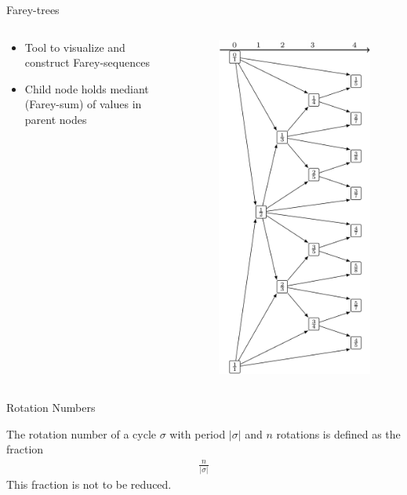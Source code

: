 \begin{frame}{Farey-trees}
	\begin{columns}
		\begin{column}{.5 \textwidth}
			\begin{itemize}
				\item Tool to visualize and construct Farey-sequences
				\item Child node holds mediant (Farey-sum) of values in parent nodes
			\end{itemize}
		\end{column}
		\begin{column}{.5 \textwidth}
			\vspace{-5em}
			\begin{figure}
				\includegraphics[width=.47 \textwidth]{../../Report/Figures/FareyTrees/LR_RotNum/adding.png}
			\end{figure}
		\end{column}
	\end{columns}
\end{frame}

\begin{frame}{Rotation Numbers}
	\vspace{-1em}
	\begin{definition}
		The rotation number of a cycle $\sigma$ with period $|\sigma|$ and $n$ rotations is defined as the fraction
		\begin{align*}
			\frac{n}{|\sigma|}
		\end{align*}
		This fraction is not to be reduced.
	\end{definition}
\end{frame}

